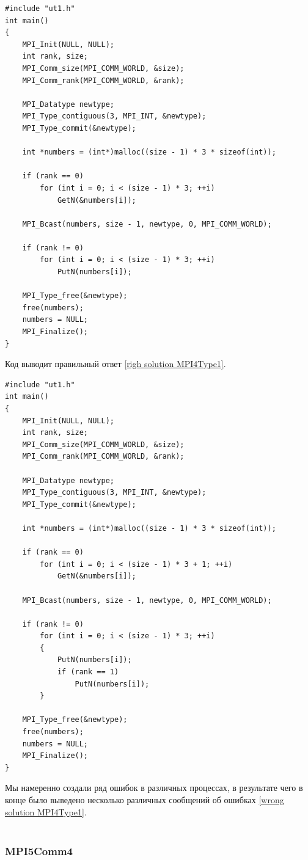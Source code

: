 \lstset{language=c++}
\begin{lstlisting}
#include "ut1.h"
int main()
{
	MPI_Init(NULL, NULL);
	int rank, size;
	MPI_Comm_size(MPI_COMM_WORLD, &size);
	MPI_Comm_rank(MPI_COMM_WORLD, &rank);

	MPI_Datatype newtype;
	MPI_Type_contiguous(3, MPI_INT, &newtype);
	MPI_Type_commit(&newtype);

	int *numbers = (int*)malloc((size - 1) * 3 * sizeof(int));

	if (rank == 0)
		for (int i = 0; i < (size - 1) * 3; ++i)
			GetN(&numbers[i]);

	MPI_Bcast(numbers, size - 1, newtype, 0, MPI_COMM_WORLD);

	if (rank != 0)
		for (int i = 0; i < (size - 1) * 3; ++i)
			PutN(numbers[i]);

	MPI_Type_free(&newtype);
	free(numbers);
	numbers = NULL;
	MPI_Finalize();
}
\end{lstlisting}

Код выводит правильный ответ \ref{righ solution MPI4Type1}.

\lstset{language=c++}
\begin{lstlisting}
#include "ut1.h"
int main()
{
	MPI_Init(NULL, NULL);
	int rank, size;
	MPI_Comm_size(MPI_COMM_WORLD, &size);
	MPI_Comm_rank(MPI_COMM_WORLD, &rank);

	MPI_Datatype newtype;
	MPI_Type_contiguous(3, MPI_INT, &newtype);
	MPI_Type_commit(&newtype);

	int *numbers = (int*)malloc((size - 1) * 3 * sizeof(int));

	if (rank == 0)
		for (int i = 0; i < (size - 1) * 3 + 1; ++i)
			GetN(&numbers[i]);

	MPI_Bcast(numbers, size - 1, newtype, 0, MPI_COMM_WORLD);

	if (rank != 0)
		for (int i = 0; i < (size - 1) * 3; ++i)
		{
			PutN(numbers[i]);
			if (rank == 1)
				PutN(numbers[i]);
		}

	MPI_Type_free(&newtype);
	free(numbers);
	numbers = NULL;
	MPI_Finalize();
}
\end{lstlisting}

Мы намеренно создали ряд ошибок в различных процессах, в результате чего в конце было выведено несколько различных сообщений об ошибках \ref{wrong solution MPI4Type1}.
\\ \\ 

\subsubsection{MPI5Comm4}

